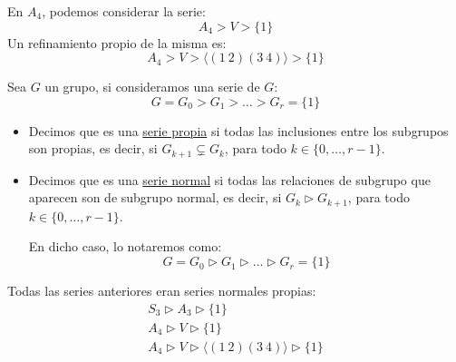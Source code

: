 \begin{ejemplo}
    En $A_4$, podemos considerar la serie:
    \begin{equation*}
        A_4 > V > \{1\}
    \end{equation*}
    Un refinamiento propio de la misma es:
    \begin{equation*}
        A_4 > V > \langle (1\ 2)(3\ 4) \rangle > \{1\}
    \end{equation*}
\end{ejemplo}

\begin{definicion}
    Sea $G$ un grupo, si consideramos una serie de $G$:
    \begin{equation*}
        G = G_0 > G_1 > \ldots > G_r = \{1\}
    \end{equation*}
    \begin{itemize}
        \item Decimos que es una \underline{serie propia} si todas las inclusiones entre los subgrupos son propias, es decir, si $G_{k+1} \subsetneq G_{k}$, para todo $k \in \{0,\ldots,r-1\}$.
        \item Decimos que es una \underline{serie normal} si todas las relaciones de subgrupo que aparecen son de subgrupo normal, es decir, si $G_k \rhd G_{k+1}$, para todo $k \in \{0,\ldots,r-1\}$.

            En dicho caso, lo notaremos como:
            \begin{equation*}
                G = G_0 \rhd G_1 \rhd \ldots \rhd G_r = \{1\}
            \end{equation*}
    \end{itemize}
\end{definicion}

\begin{ejemplo}
    Todas las series anteriores eran series normales propias:
    \begin{gather*}
        S_3 \rhd A_3 \rhd \{1\} \\
        A_4 \rhd V \rhd \{1\} \\
        A_4 \rhd V \rhd \langle (1\ 2)(3\ 4) \rangle \rhd \{1\}
    \end{gather*}
\end{ejemplo}

